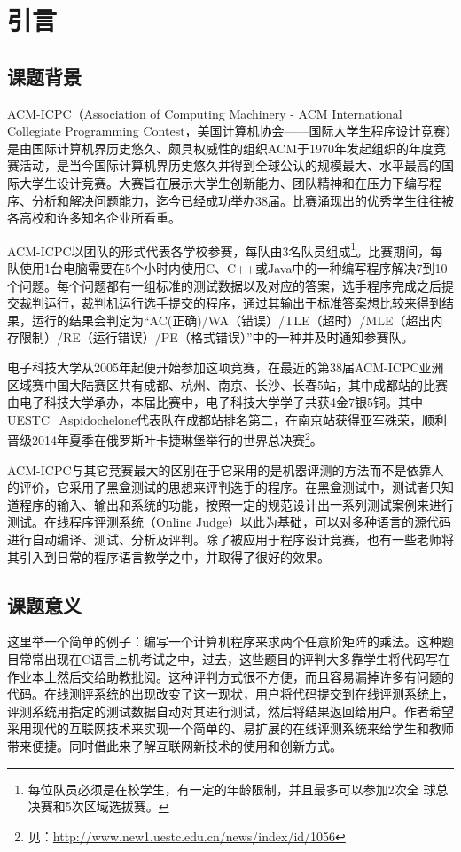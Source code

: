 
\chapter{引言}
\section{课题背景}
ACM-ICPC（Association of Computing Machinery - ACM International Collegiate Programming Contest，美国计算机协会——国际大学生程序设计竞赛）是由国际计算机界历史悠久、颇具权威性的组织ACM于1970年发起组织的年度竞赛活动，是当今国际计算机界历史悠久并得到全球公认的规模最大、水平最高的国际大学生设计竞赛。大赛旨在展示大学生创新能力、团队精神和在压力下编写程序、分析和解决问题能力，迄今已经成功举办38届。比赛涌现出的优秀学生往往被各高校和许多知名企业所看重。

ACM-ICPC以团队的形式代表各学校参赛，每队由3名队员组成\footnote{每位队员必须是在校学生，有一定的年龄限制，并且最多可以参加2次全
球总决赛和5次区域选拔赛。}。比赛期间，每队使用1台电脑需要在5个小时内使用C、C++或Java中的一种编写程序解决7到10个问题。每个问题都有一组标准的测试数据以及对应的答案，选手程序完成之后提交裁判运行，裁判机运行选手提交的程序，通过其输出于标准答案想比较来得到结果，运行的结果会判定为``AC(正确)/WA（错误）/TLE（超时）/MLE（超出内存限制）/RE（运行错误）/PE（格式错误）''中的一种并及时通知参赛队。

电子科技大学从2005年起便开始参加这项竞赛，在最近的第38届ACM-ICPC亚洲区域赛中国大陆赛区共有成都、杭州、南京、长沙、长春5站，其中成都站的比赛由电子科技大学承办，本届比赛中，电子科技大学学子共获4金7银5铜。其中UESTC\_Aspidochelone代表队在成都站排名第二，在南京站获得亚军殊荣，顺利晋级2014年夏季在俄罗斯叶卡捷琳堡举行的世界总决赛\footnote{见：\url{http://www.new1.uestc.edu.cn/news/index/id/1056}}。

ACM-ICPC与其它竞赛最大的区别在于它采用的是机器评测的方法而不是依靠人的评价，它采用了黑盒测试\cite{beizer1995black}的思想来评判选手的程序。在黑盒测试中，测试者只知道程序的输入、输出和系统的功能，按照一定的规范设计出一系列测试案例来进行测试。在线程序评测系统（Online Judge）以此为基础，可以对多种语言的源代码进行自动编译、测试、分析及评判。除了被应用于程序设计竞赛，也有一些老师将其引入到日常的程序语言教学之中，并取得了很好的效果\cite{youfeng2009acm}\cite{guosongshan2007acm}。

\section{课题意义}
这里举一个简单的例子：编写一个计算机程序来求两个任意阶矩阵的乘法。这种题目常常出现在C语言上机考试之中，过去，这些题目的评判大多靠学生将代码写在作业本上然后交给助教批阅。这种评判方式很不方便，而且容易漏掉许多有问题的代码。在线测评系统的出现改变了这一现状，用户将代码提交到在线评测系统上，评测系统用指定的测试数据自动对其进行测试，然后将结果返回给用户。作者希望采用现代的互联网技术来实现一个简单的、易扩展的在线评测系统来给学生和教师带来便捷。同时借此来了解互联网新技术的使用和创新方式。

